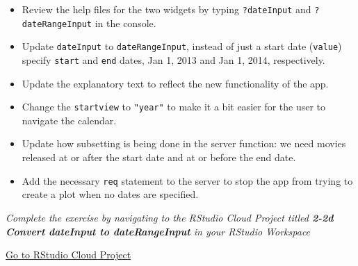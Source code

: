 \documentclass[
  letterpaper,
  DIV=11,
  numbers=noendperiod]{scrreprt}
\begin{document}
\begin{itemize}
\item
  Review the help files for the two widgets by typing
  \texttt{?dateInput} and \texttt{?dateRangeInput} in the console.
\item
  Update \texttt{dateInput} to \texttt{dateRangeInput}, instead of just
  a start date (\texttt{value}) specify \texttt{start} and \texttt{end}
  dates, Jan 1, 2013 and Jan 1, 2014, respectively.
\item
  Update the explanatory text to reflect the new functionality of the
  app.
\item
  Change the \texttt{startview} to \texttt{"year"} to make it a bit
  easier for the user to navigate the calendar.
\item
  Update how subsetting is being done in the server function: we need
  movies released at or after the start date and at or before the end
  date.
\item
  Add the necessary \texttt{req} statement to the server to stop the app
  from trying to create a plot when no dates are specified.
\end{itemize}

\emph{Complete the exercise by navigating to the RStudio Cloud Project
titled \textbf{2-2d Convert dateInput to dateRangeInput} in your RStudio
Workspace}

\href{https://rstudio.cloud/spaces/81721/join?access_code=I4VJaNsKfTqR3Td9hLP7E1nz8\%2FtMg6Xbw9Bgqumv}{
Go to RStudio Cloud Project}
\end{document}
